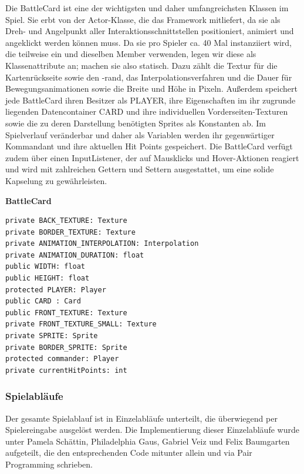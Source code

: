 Die BattleCard ist eine der wichtigsten und daher umfangreichsten Klassen im Spiel. Sie erbt von der Actor-Klasse, die das Framework mitliefert, da sie als Dreh- und Angelpunkt aller Interaktionsschnittstellen positioniert, animiert und angeklickt werden können muss. Da sie pro Spieler ca. 40 Mal instanziiert wird, die teilweise ein und dieselben Member verwenden, legen wir diese als Klassenattribute an; machen sie also statisch. Dazu zählt die Textur für die Kartenrückseite sowie den -rand, das Interpolationsverfahren und die Dauer für Bewegungsanimationen sowie die Breite und Höhe in Pixeln. Außerdem speichert jede BattleCard ihren Besitzer als PLAYER, ihre Eigenschaften im ihr zugrunde liegenden Datencontainer CARD und ihre individuellen Vorderseiten-Texturen sowie die zu deren Darstellung benötigten Sprites als Konstanten ab. Im Spielverlauf veränderbar und daher als Variablen werden ihr gegenwärtiger Kommandant und ihre aktuellen Hit Points gespeichert. Die BattleCard verfügt zudem über einen InputListener, der auf Mausklicks und Hover-Aktionen reagiert und wird mit zahlreichen Gettern und Settern ausgestattet, um eine solide Kapselung zu gewährleisten.

\textbf{BattleCard}
\begin{lstlisting}[frame=single]
private BACK_TEXTURE: Texture
private BORDER_TEXTURE: Texture
private ANIMATION_INTERPOLATION: Interpolation
private ANIMATION_DURATION: float
public WIDTH: float
public HEIGHT: float
protected PLAYER: Player
public CARD : Card
public FRONT_TEXTURE: Texture
private FRONT_TEXTURE_SMALL: Texture
private SPRITE: Sprite
private BORDER_SPRITE: Sprite
protected commander: Player
private currentHitPoints: int
\end{lstlisting}

\subsubsection{Spielabläufe}
Der gesamte Spielablauf ist in Einzelabläufe unterteilt, die überwiegend per Spielereingabe ausgelöst werden. Die Implementierung dieser Einzelabläufe wurde unter Pamela Schättin, Philadelphia Gaus, Gabriel Veiz und Felix Baumgarten aufgeteilt, die den entsprechenden Code mitunter allein und via Pair Programming schrieben.

